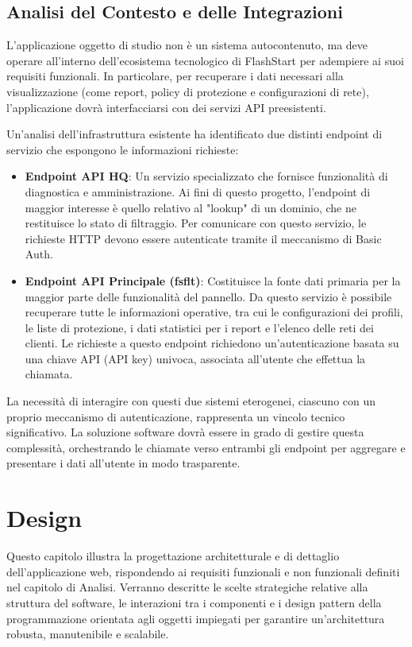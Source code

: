 \documentclass[12pt,a4paper,openright,twoside]{book}
\begin{document}
\section{Analisi del Contesto e delle Integrazioni}
\label{sec:analisi_contesto}
L'applicazione oggetto di studio non è un sistema autocontenuto, ma deve operare all'interno dell'ecosistema tecnologico di FlashStart per adempiere ai suoi requisiti funzionali. In particolare, per recuperare i dati necessari alla visualizzazione (come report, policy di protezione e configurazioni di rete), l'applicazione dovrà interfacciarsi con dei servizi API preesistenti.

Un'analisi dell'infrastruttura esistente ha identificato due distinti endpoint di servizio che espongono le informazioni richieste:
\begin{itemize}
    \item \textbf{Endpoint API HQ}: Un servizio specializzato che fornisce funzionalità di diagnostica e amministrazione. Ai fini di questo progetto, l'endpoint di maggior interesse è quello relativo al "lookup" di un dominio, che ne restituisce lo stato di filtraggio. Per comunicare con questo servizio, le richieste HTTP devono essere autenticate tramite il meccanismo di Basic Auth.

    \item \textbf{Endpoint API Principale (fsflt)}: Costituisce la fonte dati primaria per la maggior parte delle funzionalità del pannello. Da questo servizio è possibile recuperare tutte le informazioni operative, tra cui le configurazioni dei profili, le liste di protezione, i dati statistici per i report e l'elenco delle reti dei clienti. Le richieste a questo endpoint richiedono un'autenticazione basata su una chiave API (API key) univoca, associata all'utente che effettua la chiamata.
\end{itemize}
La necessità di interagire con questi due sistemi eterogenei, ciascuno con un proprio meccanismo di autenticazione, rappresenta un vincolo tecnico significativo. La soluzione software dovrà essere in grado di gestire questa complessità, orchestrando le chiamate verso entrambi gli endpoint per aggregare e presentare i dati all'utente in modo trasparente.

\chapter{Design}
\label{chap:design}

Questo capitolo illustra la progettazione architetturale e di dettaglio dell'applicazione web, rispondendo ai requisiti funzionali e non funzionali definiti nel capitolo di Analisi. Verranno descritte le scelte strategiche relative alla struttura del software, le interazioni tra i componenti e i design pattern della programmazione orientata agli oggetti impiegati per garantire un'architettura robusta, manutenibile e scalabile.
\end{document}
